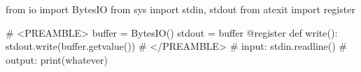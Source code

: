 from io import BytesIO
from sys import stdin, stdout
from atexit import register

# <PREAMBLE>
buffer = BytesIO()
stdout = buffer
@register
def write(): stdout.write(buffer.getvalue())
# </PREAMBLE>
# input: stdin.readline()
# output: print(whatever)

